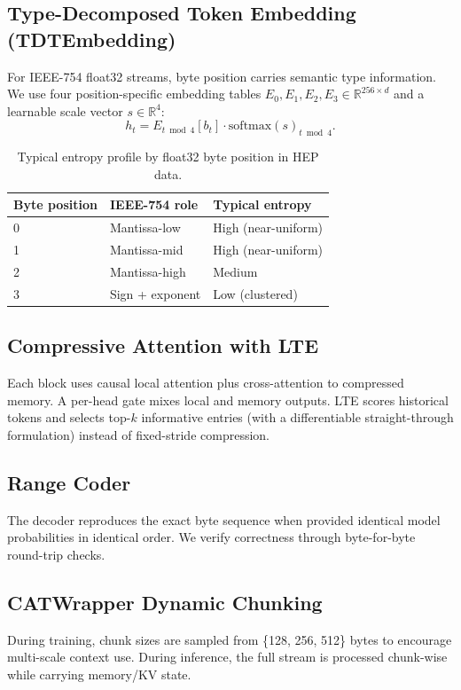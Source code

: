 \documentclass[10pt,twocolumn]{article}
\begin{document}
\subsection{Type-Decomposed Token Embedding (TDTEmbedding)}
For IEEE-754 float32 streams, byte position carries semantic type information. We use four position-specific embedding tables $E_0, E_1, E_2, E_3\in\mathbb{R}^{256\times d}$ and a learnable scale vector $s\in\mathbb{R}^4$:
\begin{equation}
h_t = E_{t\bmod 4}[b_t]\cdot \mathrm{softmax}(s)_{t\bmod 4}.
\end{equation}

\begin{table}[h]
\centering
\small
\caption{Typical entropy profile by float32 byte position in HEP data.}
\label{tab:tdt_positions}
\begin{tabular}{@{}lll@{}}
\toprule
Byte position & IEEE-754 role & Typical entropy \\
\midrule
0 & Mantissa-low & High (near-uniform) \\
1 & Mantissa-mid & High (near-uniform) \\
2 & Mantissa-high & Medium \\
3 & Sign + exponent & Low (clustered) \\
\bottomrule
\end{tabular}
\end{table}

\subsection{Compressive Attention with LTE}
Each block uses causal local attention plus cross-attention to compressed memory. A per-head gate mixes local and memory outputs. LTE scores historical tokens and selects top-$k$ informative entries (with a differentiable straight-through formulation) instead of fixed-stride compression.

\subsection{Range Coder}
The decoder reproduces the exact byte sequence when provided identical model probabilities in identical order. We verify correctness through byte-for-byte round-trip checks.

\subsection{CATWrapper Dynamic Chunking}
During training, chunk sizes are sampled from \{128, 256, 512\} bytes to encourage multi-scale context use. During inference, the full stream is processed chunk-wise while carrying memory/KV state.
\end{document}
